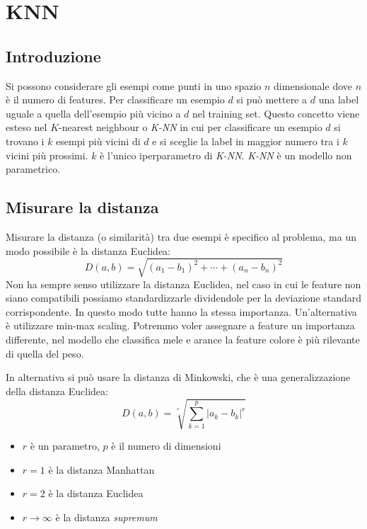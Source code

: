 \chapter{KNN}

\section{Introduzione}
Si possono considerare gli esempi come punti in uno spazio $n$ dimensionale dove $n$ \`e il numero di features.
Per classificare un esempio $d$ si pu\`o mettere a $d$ una label uguale a quella dell'esempio pi\`u vicino a $d$ nel training set.
Questo concetto viene esteso nel $K$-nearest neighbour o \emph{K-NN} in cui per classificare un esempio $d$ si trovano i $k$ esempi pi\`u vicini di $d$ e si sceglie la label in maggior numero tra i $k$ vicini pi\`u prossimi. $k$ è l'unico iperparametro di \emph{K-NN}.
\emph{K-NN} \`e un modello non parametrico.

\section{Misurare la distanza}
Misurare la distanza (o similarit\`a) tra due esempi \`e specifico al problema, ma un modo possibile \`e la distanza Euclidea:
$$D(a,b)=\sqrt{(a_1-b_1)^2+\cdots+(a_n-b_n)^2}$$
Non ha sempre senso utilizzare la distanza Euclidea, nel caso in cui le feature non siano compatibili possiamo standardizzarle dividendole per la deviazione standard corrispondente. In questo modo tutte hanno la stessa importanza. Un'alternativa \`e utilizzare min-max scaling. Potremmo voler assegnare a feature un importanza differente, nel modello che classifica mele e arance la feature colore \`e più rilevante di quella del peso. 

In alternativa si pu\`o usare la distanza di Minkowski, che \`e una generalizzazione della distanza Euclidea:
$$D(a,b) = \sqrt[r]{\sum_{k=1}^{p}{|a_k - b_k|^r}}$$

\begin{multicols}{2}
	\begin{itemize}
		\item $r$ \`e un parametro, $p$ \`e il numero di dimensioni
		\item $r=1$ \`e la distanza Manhattan
		\item $r=2$ \`e la distanza Euclidea
		\item $r\rightarrow\infty$ \`e la distanza \textit{supremum}
	\end{itemize}
\end{multicols}


